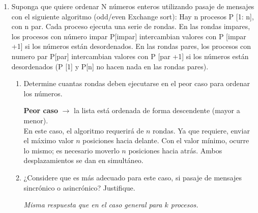 \documentclass[a4paper, 10pt]{article}
\newenvironment{QandA}{
    \begin{enumerate}\bfseries}
    {\end{enumerate}
}
\newenvironment{answered}{\par\normalfont}{}
\begin{document}
\begin{QandA}
\item Suponga que quiere ordenar N números enteros utilizando pasaje de mensajes con el siguiente algoritmo (odd/even Exchange sort): Hay  n procesos P [1: n], con n par. Cada proceso ejecuta una serie de rondas. En las rondas impares, los procesos con número impar P[impar] intercambian valores con P [impar +1] si los números están desordenados. En las rondas pares, los procesos con numero par P[par] intercambian valores con P [par +1] si los números están desordenados (P [1] y P[n] no hacen nada en las rondas pares).
\begin{enumerate}
    \item Determine cuantas rondas deben ejecutarse en el peor caso para ordenar los números.
    \begin{answered}
        \textbf{Peor caso} $\rightarrow$ la lista está ordenada de forma descendente (mayor a menor).
        \\
        En este caso, el algoritmo requerirá de $n$ rondas. Ya que requiere, enviar el máximo valor $n$ posiciones hacia delante. Con el valor mínimo, ocurre lo mismo; es necesario moverlo $n$ posiciones hacia atrás. Ambos desplazamientos se dan en simultáneo.
    \end{answered}
    \item ¿Considere que es más adecuado para este caso, si pasaje de mensajes sincrónico o asincrónico? Justifique.
    \begin{answered}
        \emph{Misma respuesta que en el caso general para $k$ procesos.}
    \end{answered}
\end{enumerate}
\end{QandA}
\end{document}
